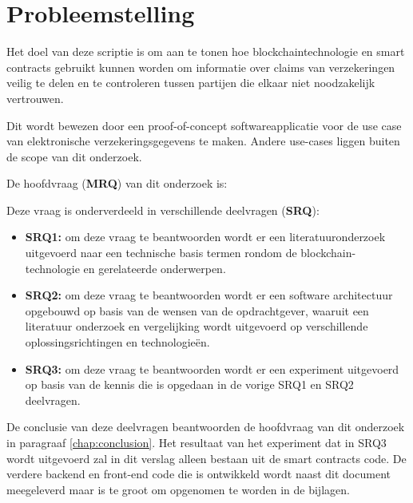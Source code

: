 \newpage

\section{Probleemstelling}\label{chap:researchQuestions}
Het doel van deze scriptie is om aan te tonen hoe blockchaintechnologie en smart contracts gebruikt kunnen worden om informatie over claims van verzekeringen veilig te delen en te controleren tussen partijen die elkaar niet noodzakelijk vertrouwen.\par
Dit wordt bewezen door een proof-of-concept softwareapplicatie voor de use case van elektronische verzekeringsgegevens  te maken. Andere use-cases liggen buiten de scope van dit onderzoek.
\par
De hoofdvraag (\textbf{MRQ}) van dit onderzoek is:
\begin{center}
	\textbf{\researchQuestionMain}
\end{center}

Deze vraag is onderverdeeld in verschillende deelvragen (\textbf{SRQ}):
\begin{itemize}
	\item \textbf{SRQ1: \researchQuestionOne} om deze vraag te beantwoorden wordt er een  literatuuronderzoek uitgevoerd naar een technische basis termen rondom de blockchain-technologie en gerelateerde onderwerpen.
  \item \textbf{SRQ2: \researchQuestionTwo} om deze vraag te beantwoorden wordt er een software architectuur opgebouwd op basis van de wensen van de opdrachtgever, waaruit een literatuur onderzoek en vergelijking wordt uitgevoerd op verschillende oplossingsrichtingen en technologieën.
  \item \textbf{SRQ3: \researchQuestionThree} om deze vraag te beantwoorden wordt er een experiment uitgevoerd op basis van de kennis die is opgedaan in de vorige SRQ1 en SRQ2 deelvragen.
\end{itemize}

De conclusie van deze deelvragen beantwoorden de hoofdvraag van dit onderzoek in paragraaf \ref{chap:conclusion}. Het resultaat van het experiment dat in SRQ3 wordt uitgevoerd zal in dit verslag alleen bestaan uit de smart contracts code. De verdere backend en front-end code die is ontwikkeld wordt naast dit document meegeleverd maar is te groot om opgenomen te worden in de bijlagen.\par
\newpage